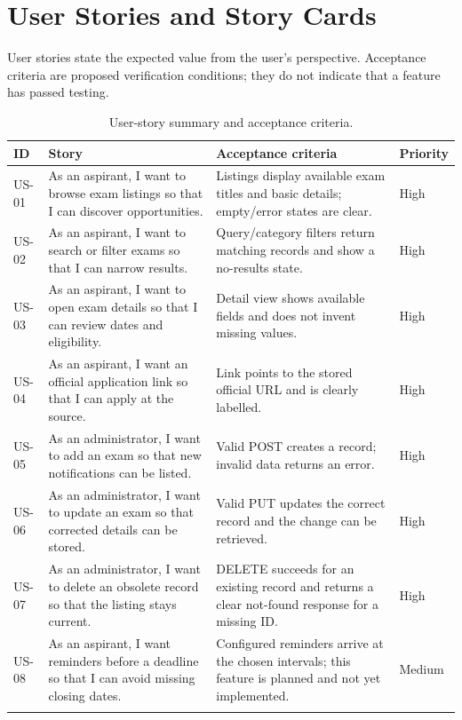 \documentclass[12pt,a4paper]{report}
\begin{document}
\section{User Stories and Story Cards}
User stories state the expected value from the user's perspective. Acceptance criteria are proposed verification conditions; they do not indicate that a feature has passed testing.

\begin{longtable}{p{} p{} p{} p{}}
\toprule\textbf{ID} & \textbf{Story} & \textbf{Acceptance criteria} & \textbf{Priority}\\\midrule
US-01 & As an aspirant, I want to browse exam listings so that I can discover opportunities. & Listings display available exam titles and basic details; empty/error states are clear. & High\\
US-02 & As an aspirant, I want to search or filter exams so that I can narrow results. & Query/category filters return matching records and show a no-results state. & High\\
US-03 & As an aspirant, I want to open exam details so that I can review dates and eligibility. & Detail view shows available fields and does not invent missing values. & High\\
US-04 & As an aspirant, I want an official application link so that I can apply at the source. & Link points to the stored official URL and is clearly labelled. & High\\
US-05 & As an administrator, I want to add an exam so that new notifications can be listed. & Valid POST creates a record; invalid data returns an error. & High\\
US-06 & As an administrator, I want to update an exam so that corrected details can be stored. & Valid PUT updates the correct record and the change can be retrieved. & High\\
US-07 & As an administrator, I want to delete an obsolete record so that the listing stays current. & DELETE succeeds for an existing record and returns a clear not-found response for a missing ID. & High\\
US-08 & As an aspirant, I want reminders before a deadline so that I can avoid missing closing dates. & Configured reminders arrive at the chosen intervals; this feature is planned and not yet implemented. & Medium\\
\bottomrule
\caption{User-story summary and acceptance criteria.}\label{tab:stories}
\end{longtable}
\end{document}
